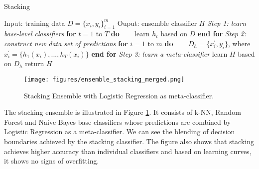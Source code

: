 \begin{algorithm}
\caption{Stacking}
\label{alg:ensemble_stacking}
\begin{algorithmic}[1]
\STATE Input: training data $D=\{x_i,y_i\}_{i=1}^{m}$
\STATE Ouput: ensemble classifier $H$
\STATE \textit{Step 1: learn base-level classifiers}
\STATE \textbf{for} $t = 1$ to $T$ \textbf{do}  
\STATE ~~~ learn $h_t$ based on $D$
\STATE \textbf{end for} 
\STATE \textit{Step 2: construct new data set of predictions}
\STATE \textbf{for} $i = 1$ to $m$ \textbf{do} 
\STATE ~~~ $D_{h} = \{x_{i}^{\prime}, y_i\}$, where $x_{i}^{\prime}=\{h_1(x_i),...,h_T(x_i)\}$
\STATE \textbf{end for}
\STATE \textit{Step 3: learn a meta-classifier}
\STATE learn $H$ based on $D_h$
\STATE return $H$
\end{algorithmic}
\end{algorithm}


\begin{figure}[tbhp]
    \centering
    \texttt{[image: figures/ensemble\_stacking\_merged.png]}
    \caption{Stacking Ensemble with Logistic Regression as meta-classifier.}
    \label{fig:ensemble_stacking}
\end{figure}

The stacking ensemble is illustrated in Figure \ref{fig:ensemble_stacking}. It consists of k-NN, Random Forest and Naive Bayes base classifiers whose predictions are combined by Logistic Regression as a meta-classifier. We can see the blending of decision boundaries achieved by the stacking classifier. The figure also shows that stacking achieves higher accuracy than individual classifiers and based on learning curves, it shows no signs of overfitting.\\ 





